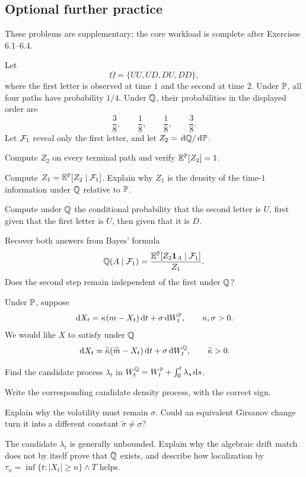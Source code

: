 \ifIncludeFurther
{}
\subsection*{Optional further practice}
\noindent These problems are supplementary; the core workload is complete after Exercises 6.1--6.4.
\setcounter{exercise}{4}
\begin{exercise}
Let
\[
\Omega=\{UU,UD,DU,DD\},
\]
where the first letter is observed at time \(1\) and the second at time \(2\).
Under \(\mathbb P\), all four paths have probability \(1/4\). Under \(\mathbb Q\), their
probabilities in the displayed order are
\[
\frac38,\qquad\frac18,\qquad\frac18,\qquad\frac38.
\]
Let \(\mathcal F_1\) reveal only the first letter, and let
\(Z_2=\,\mathrm d\mathbb Q/\,\mathrm d\mathbb P\).
\begin{exparts}
  \item Compute \(Z_2\) on every terminal path and verify
  \(\mathbb E^{\mathbb P}[Z_2]=1\).
  \item Compute \(Z_1=\mathbb E^{\mathbb P}[Z_2\mid\mathcal F_1]\). Explain why \(Z_1\) is the
  density of the time-\(1\) information under \(\mathbb Q\) relative to \(\mathbb P\).
  \item Compute under \(\mathbb Q\) the conditional probability that the second
  letter is \(U\), first given that the first letter is \(U\), then given
  that it is \(D\).
  \item Recover both answers from Bayes' formula
  \[
  \mathbb Q(A\mid\mathcal F_1)
  =\frac{\mathbb E^{\mathbb P}[Z_2\mathbf{1}_A\mid\mathcal F_1]}{Z_1}.
  \]
  Does the second step remain independent of the first under \(\mathbb Q\)?
\end{exparts}
\end{exercise}

\begin{exercise}
Under \(\mathbb P\), suppose
\[
\,\mathrm d X_t=\kappa(m-X_t)\,\mathrm d t+\sigma\,\mathrm d W_t^{\mathbb P},
\qquad \kappa,\sigma>0.
\]
We would like \(X\) to satisfy under \(\mathbb Q\)
\[
\,\mathrm d X_t=\widetilde\kappa(\widetilde m-X_t)\,\mathrm d t
+\sigma\,\mathrm d W_t^{\mathbb Q},
\qquad \widetilde\kappa>0.
\]
\begin{exparts}
  \item Find the candidate process \(\lambda_t\) in
  \(W_t^{\mathbb Q}=W_t^{\mathbb P}+\int_0^t\lambda_s\,\mathrm d s\).
  \item Write the corresponding candidate density process, with the correct
  sign.
  \item Explain why the volatility must remain \(\sigma\). Could an
  equivalent Girsanov change turn it into a different constant
  \(\widetilde\sigma\neq\sigma\)?
  \item The candidate \(\lambda_t\) is generally unbounded. Explain why the
  algebraic drift match does not by itself prove that \(\mathbb Q\) exists, and
  describe how localization by
  \(\tau_n=\inf\{t:|X_t|\geq n\}\wedge T\) helps.
\end{exparts}
\end{exercise}
\fi
